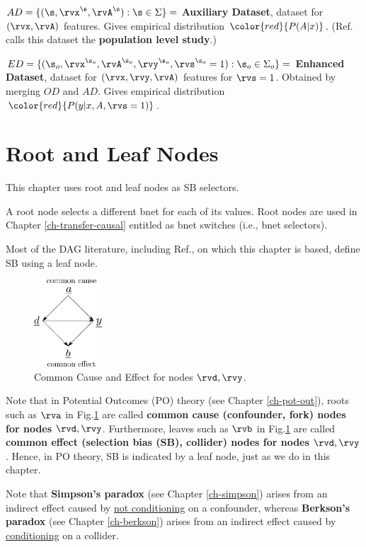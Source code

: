 $AD=\{(\s, \rvx^\s,\rvA^\s):\s\in\Sigma\}=$
{\bf Auxiliary Dataset}, dataset for $(\rvx, \rvA)$ features.
Gives empirical
distribution $\color{red}{P(A|x)}$.
(Ref.\cite{bare-sb-removal}
calls this dataset the
{\bf population level study}.)


$ED=\{({\s_o},\rvx^{\s_o}, \rvA^{\s_o}, \rvy^{\s_o},
\rvs^{\s_o}=1):{\s_o}\in\Sigma_o\}=$
{\bf Enhanced Dataset}, dataset for $(\rvx,\rvy, \rvA)$ features
for $\rvs=1$.
Obtained by merging $OD$ and $AD$.
Gives empirical
distribution $\color{red}{P(y|x, A, \rvs=1)}$.

\section{Root and Leaf Nodes}

This chapter uses root and leaf nodes
as SB selectors.

A root node selects a different bnet 
for each of its values.
Root nodes are used
in Chapter \ref{ch-transfer-causal}
entitled 
as bnet switches (i.e., bnet selectors).


Most of the DAG literature,
including Ref.\cite{bare-sb-removal},
on which this chapter is based,
define SB using a leaf node.


\begin{figure}[h!]
\centering
\includegraphics[width=1in]
{sb-removal/common-cause-effect.png}
\caption{Common Cause
and Effect for
nodes $\rvd,\rvy$.}
\label{fig-common-cause-effect}
\end{figure}

Note
that in Potential
Outcomes (PO) theory
 (see Chapter \ref{ch-pot-out}),
roots such
as $\rva$ in
Fig.\ref{fig-common-cause-effect}
are called {\bf common cause
 (confounder, fork) nodes
for nodes $\rvd, \rvy$}.
Furthermore, leaves such as
$\rvb$ in
Fig.\ref{fig-common-cause-effect} are
called
{\bf common effect
(selection bias (SB), collider) nodes
for nodes $\rvd, \rvy$}.
Hence, in PO theory,
SB is indicated
by
a leaf node,
just as we do in this chapter.

Note that
{\bf Simpson's paradox} (see Chapter
\ref{ch-simpson}) arises from an indirect effect
caused by \ul{not conditioning}
on a confounder,
whereas
{\bf Berkson's paradox}
(see Chapter \ref{ch-berkson})
arises from an indirect effect
caused by \ul{conditioning}
on a collider.



